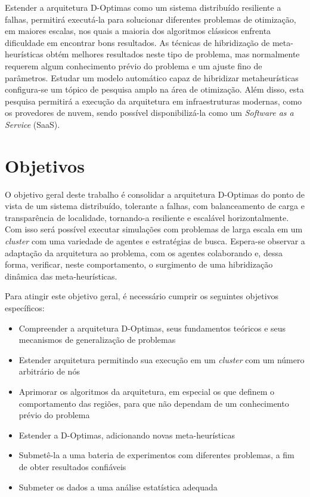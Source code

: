 Estender a arquitetura D-Optimas como um sistema distribuído resiliente a falhas, permitirá executá-la para solucionar diferentes problemas de otimização, em maiores escalas, nos quais a maioria dos algoritmos clássicos enfrenta dificuldade em encontrar bons resultados. As técnicas de hibridização de meta-heurísticas obtém melhores resultados neste tipo de problema, mas normalmente requerem algum conhecimento prévio do problema e um ajuste fino de parâmetros. Estudar um modelo automático capaz de hibridizar metaheurísticas configura-se um tópico de pesquisa amplo na área de otimização. Além disso, esta pesquisa permitirá a execução da arquitetura em infraestruturas modernas, como os provedores de nuvem, sendo possível  disponibilizá-la como um \textit{Software as a Service} (SaaS).

\section{Objetivos}

O objetivo geral deste trabalho é consolidar a arquitetura D-Optimas do ponto de vista de um sistema distribuído, tolerante a falhas, com balanceamento de carga e transparência de localidade, tornando-a resiliente e escalável horizontalmente. Com isso será possível executar simulações com problemas de larga escala em um \textit{cluster} com uma variedade de agentes e estratégias de busca. Espera-se observar a adaptação da arquitetura ao problema, com os agentes colaborando e, dessa forma, verificar, neste comportamento,  o surgimento de uma hibridização dinâmica das meta-heurísticas.

Para atingir este objetivo geral, é necessário cumprir os seguintes objetivos específicos: 

\begin{itemize}
    \item Compreender a arquitetura D-Optimas, seus fundamentos teóricos e seus mecanismos de generalização de problemas
    \item Estender arquitetura permitindo sua execução em um \textit{cluster} com um número arbitrário de nós
    \item Aprimorar os algoritmos da arquitetura, em especial os que definem o comportamento das regiões, para que não dependam de um conhecimento prévio do problema 
    \item Estender a D-Optimas, adicionando novas meta-heurísticas
    \item Submetê-la a uma bateria de experimentos com diferentes problemas, a fim de obter resultados confiáveis
    \item Submeter os dados a uma análise estatística adequada 
\end{itemize}

